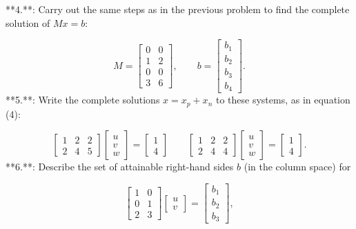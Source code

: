 

**4.**: Carry out the same steps as in the previous problem to find the complete solution of \(Mx=b\):

\[M=\begin{bmatrix}0&0\\ 1&2\\ 0&0\\ 3&6\end{bmatrix},\qquad b=\begin{bmatrix}b_{1}\\ b_{2}\\ b_{3}\\ b_{4}\end{bmatrix}.\]
**5.**: Write the complete solutions \(x=x_{p}+x_{n}\) to these systems, as in equation (4):

\[\begin{bmatrix}1&2&2\\ 2&4&5\end{bmatrix}\begin{bmatrix}u\\ v\\ w\end{bmatrix}=\begin{bmatrix}1\\ 4\end{bmatrix}\qquad\begin{bmatrix}1&2&2\\ 2&4&4\end{bmatrix}\begin{bmatrix}u\\ v\\ w\end{bmatrix}=\begin{bmatrix}1\\ 4\end{bmatrix}.\]
**6.**: Describe the set of attainable right-hand sides \(b\) (in the column space) for

\[\begin{bmatrix}1&0\\ 0&1\\ 2&3\end{bmatrix}\begin{bmatrix}u\\ v\end{bmatrix}=\begin{bmatrix}b_{1}\\ b_{2}\\ b_{3}\end{bmatrix},\]

